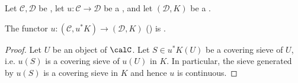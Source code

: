 \begin{proposition} \label{proposition:functor_from_induced_site_to_site_is_continuous_functor}
Let $\mathcal{C}, \mathcal{D}$ be , let $u: \mathcal{C} \to \mathcal{D}$ be a , and let $(\mathcal{D}, K)$ be a .

The functor $u: (\mathcal{C}, u^*K) \to (\mathcal{D}, K)$ () is .
\end{proposition}

\begin{proof}
    Let $U$ be an object of $\calC$. Let $S \in u^*K(U)$ be a covering sieve of $U$, i.e. $u(S)$ is a covering sieve of $u(U)$ in $K$. In particular, the sieve generated by $u(S)$ is a covering sieve in $K$ and hence $u$ is continuous.
\end{proof}